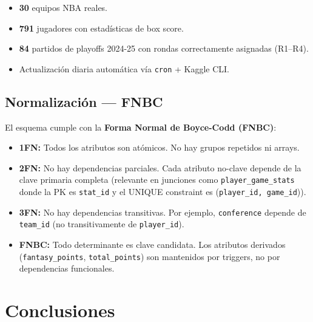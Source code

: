 \documentclass[12pt,a4paper]{article}
\begin{document}
\begin{itemize}[nosep]
    \item \textbf{30} equipos NBA reales.
    \item \textbf{791} jugadores con estad\'isticas de box score.
    \item \textbf{84} partidos de playoffs 2024-25 con rondas correctamente asignadas (R1--R4).
    \item Actualizaci\'on diaria autom\'atica v\'ia \texttt{cron} + Kaggle CLI.
\end{itemize}

\subsection{Normalizaci\'on --- FNBC}

El esquema cumple con la \textbf{Forma Normal de Boyce-Codd (FNBC)}:

\begin{itemize}
    \item \textbf{1FN:} Todos los atributos son at\'omicos. No hay grupos repetidos ni arrays.
    \item \textbf{2FN:} No hay dependencias parciales. Cada atributo no-clave depende de la clave
          primaria completa (relevante en junciones como \texttt{player\_game\_stats} donde la PK
          es \texttt{stat\_id} y el UNIQUE constraint es (\texttt{player\_id, game\_id})).
    \item \textbf{3FN:} No hay dependencias transitivas. Por ejemplo, \texttt{conference} depende
          de \texttt{team\_id} (no transitivamente de \texttt{player\_id}).
    \item \textbf{FNBC:} Todo determinante es clave candidata. Los atributos derivados
          (\texttt{fantasy\_points}, \texttt{total\_points}) son mantenidos por triggers,
          no por dependencias funcionales.
\end{itemize}

\section{Conclusiones}
\end{document}
